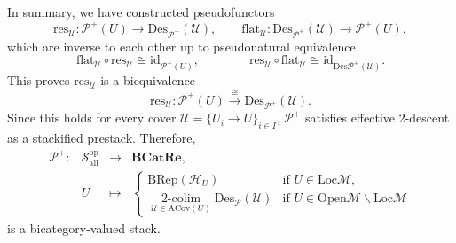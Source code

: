 \documentclass[reqno]{amsart}
\theoremstyle{definition}
\theoremstyle{remark}
\begin{document}
In summary, we have constructed pseudofunctors
\begin{equation}
\text{res}_{\mathcal{U}}:
\mathscr{P}^+(U)
\longrightarrow
\text{Des}_{\mathscr{P}^+}(\mathcal{U}), \qquad \text{flat}_{\mathcal{U}}:
\text{Des}_{\mathscr{P}^+}(\mathcal{U})
\longrightarrow
\mathscr{P}^+(U),
\end{equation}
which are inverse to each other up to pseudonatural equivalence
\begin{equation}
    \text{flat}_{\mathcal{U}}\circ \text{res}_{\mathcal{U}}
\cong
\text{id}_{\mathscr{P}^+(U)}, \qquad \qquad \text{res}_{\mathcal{U}}\circ \text{flat}_{\mathcal{U}}
\cong
\text{id}_{\text{Des}{\mathscr{P}^+}(\mathcal{U})}.
\end{equation}
This proves $\text{res}_{\mathcal{U}}$ is a biequivalence
\begin{equation}
\text{res}_{\mathcal{U}}:
\mathscr{P}^+(U)
\mathop{\longrightarrow}\limits^{\cong}
\text{Des}_{\mathscr{P}^+}(\mathcal{U}).
\end{equation}
Since this holds for every cover $\mathcal{U}=\{U_i\to U\}_{i\in I}$, $\mathscr{P}^+$ satisfies effective 2-descent as a stackified prestack. Therefore, 
\begin{equation}
        \begin{array}{rccl}
\mathscr{P}^+: & \mathscr{S}_{\text{all}}^{\text{op}}& \longrightarrow & \textbf{BCatRe}, \\
 & U & \longmapsto  & \left\{\begin{array}{cl}
      \text{BRep}(\mathscr{H}_U)&\text{if } U \in \text{Loc}\mathcal{M},  \\
      \mathop{2\text{-colim}}\limits_{\mathcal{U}\in\text{ACov}(U)}{\text{Des}_\mathscr{P}(\mathcal{U})}&\text{if } U \in \text{Open}\mathcal{M}\backslash\text{Loc}\mathcal{M}
 \end{array}\right.
\end{array}
    \end{equation}
is a bicategory-valued stack.




















\vspace{1cm}



 
\end{document}
